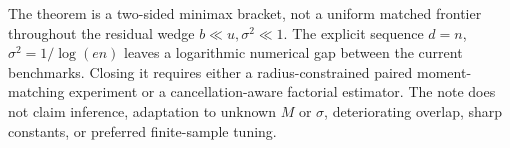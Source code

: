 The theorem is a two-sided minimax bracket, not a uniform matched frontier throughout the residual wedge \(b\ll u,\sigma^2\ll1\).  The explicit sequence \(d=n\), \(\sigma^2=1/\log(en)\) leaves a logarithmic numerical gap between the current benchmarks.  Closing it requires either a radius-constrained paired moment-matching experiment or a cancellation-aware factorial estimator.  The note does not claim inference, adaptation to unknown \(M\) or \(\sigma\), deteriorating overlap, sharp constants, or preferred finite-sample tuning.